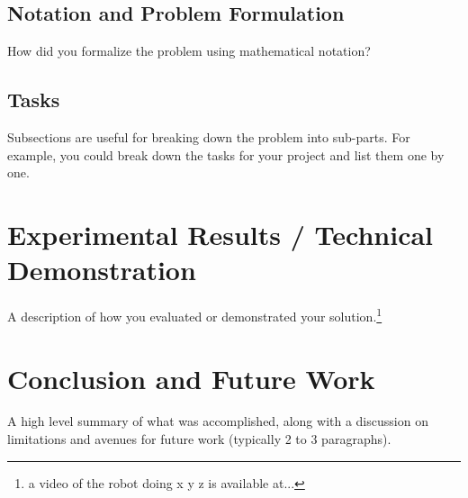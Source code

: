 \documentclass{article}
\begin{document}

\subsection{Notation and Problem Formulation}

How did you formalize the problem using mathematical notation?

\subsection{Tasks}

Subsections are useful for breaking down the problem into sub-parts. For example, you could break down the tasks for your project and list them one by one. 

\section{Experimental Results / Technical Demonstration}

A description of how you evaluated or demonstrated your solution.\footnote{a video of the robot doing x y z is available at...} 



\section{Conclusion and Future Work}

A high level summary of what was accomplished, along with a discussion on limitations and avenues for future work (typically 2 to 3 paragraphs). 


\end{document}
